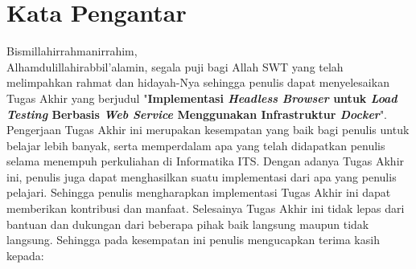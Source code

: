 \chapter{Kata Pengantar}
		Bismillahirrahmanirrahim, \\
		Alhamdulillahirabbil’alamin, segala puji bagi Allah SWT yang telah melimpahkan rahmat dan hidayah-Nya sehingga penulis dapat menyelesaikan Tugas Akhir yang berjudul "\textbf{Implementasi \textit{Headless Browser} untuk \textit{Load Testing} Berbasis \textit{Web Service} Menggunakan Infrastruktur \textit{Docker}}". Pengerjaan Tugas Akhir ini merupakan kesempatan yang baik bagi penulis untuk belajar lebih banyak, serta memperdalam apa yang telah didapatkan penulis selama menempuh perkuliahan di Informatika ITS. Dengan adanya Tugas Akhir ini, penulis juga dapat menghasilkan suatu implementasi dari apa yang penulis pelajari. Sehingga penulis mengharapkan implementasi Tugas Akhir ini dapat memberikan kontribusi dan manfaat. Selesainya Tugas Akhir ini tidak lepas dari bantuan dan dukungan dari beberapa pihak baik langsung maupun tidak langsung. Sehingga pada kesempatan ini penulis mengucapkan terima kasih kepada:
